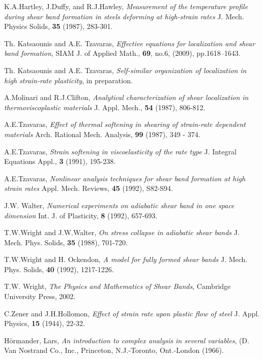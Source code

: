 \documentclass[a4paper,11pt]{article}
\theoremstyle{remark}
\begin{document}
\begin{thebibliography}{10}
{\sc K.A.Hartley, J.Duffy, and R.J.Hawley},
{\sl Measurement of the temperature profile during shear band formation in steels deforming at high-strain rates}
 J. Mech. Physics Solids, {\bf 35} (1987), 283-301.

{\sc Th. Katsaounis and A.E. Tzavaras}, {\sl Effective equations for localization and shear band formation},  SIAM J. of Applied Math., {\bf{69}}, no.6, (2009), pp.1618--1643. 

{\sc Th. Katsaounis and A.E. Tzavaras}, {\sl Self-similar organization of localization in high strain-rate
plasticity}, in preparation. 

{\sc A.Molinari and R.J.Clifton},
{\sl Analytical characterization of shear localization in thermoviscoplastic materials}
 J. Appl. Mech.,  {\bf 54} (1987), 806-812.

{\sc A.E.Tzavaras}, 
{\sl Effect of thermal softening in shearing of strain-rate dependent materials}
Arch. Rational Mech. Analysis, {\bf 99} (1987), 349 - 374.

{\sc A.E.Tzavaras}, 
{\sl Strain softening in viscoelasticity of the rate type}
J. Integral Equations Appl., {\bf 3} (1991), 195-238.

{\sc A.E.Tzavaras},
{\sl Nonlinear analysis techniques for shear band formation at high strain rates}
Appl. Mech. Reviews, {\bf 45} (1992), S82-S94.


{\sc  J.W. Walter},
{\sl Numerical experiments on adiabatic shear band in one space dimension}
Int. J. of Plasticity, {\bf 8} (1992), 657-693.

{\sc T.W.Wright and J.W.Walter}, 
{\sl On stress collapse in adiabatic shear bands}
J. Mech. Phys. Solids, {\bf 35} (1988), 701-720. 

{\sc T.W.Wright and H. Ockendon},
{\sl A model for fully formed shear bands}
J. Mech. Phys. Solids, {\bf 40} (1992), 1217-1226.

{\sc T.W. Wright}, 
{\sl The Physics and Mathematics of Shear Bands}, 
Cambridge University Press, 2002. 

{\sc  C.Zener and J.H.Hollomon}, 
{\sl Effect of strain rate upon plastic flow of steel} 
J. Appl. Physics, {\bf 15} (1944), 22-32.

{\sc H\"ormander, Lars},
{\it An introduction to complex analysis in several variables},
(D. Van Nostrand Co., Inc., Princeton, N.J.-Toronto, Ont.-London (1966).


\end{thebibliography}
\end{document}
